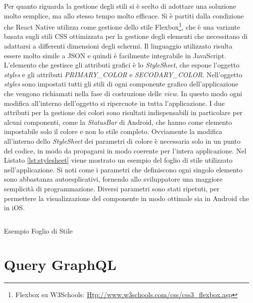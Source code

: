 Per quanto riguarda la gestione degli stili si è scelto di adottare una soluzione molto semplice, ma allo stesso tempo molto efficace. Si è partiti dalla condizione che React Native utilizza come gestione dello stile Flexbox\footnote{Flexbox su W3Schools: \url{Htp://www.w3schools.com/css/css3_flexbox.asp}}, che è una variante basata sugli stili CSS ottimizzata per la gestione degli elementi che necessitano di adattarsi a differenti dimensioni degli schermi. Il linguaggio utilizzato risulta essere molto simile a JSON e quindi è facilmente integrabile in JavaScript. L'elemento che gestisce gli attributi grafici è lo \emph{StyleSheet}, che espone l'oggetto \emph{styles} e gli attributi \emph{PRIMARY\_COLOR} e \emph{SECODARY\_COLOR}.
Nell'oggetto \emph{styles} sono impostati tutti gli stili di ogni componente grafico dell'applicazione che vengono richiamati nella fase di costruzione delle \emph{view}. In questo modo ogni modifica all'interno dell'oggetto si ripercuote in tutta l'applicazione.
I due attributi per la gestione dei colori sono risultati indispensabili in particolare per alcuni componenti, come la \emph{StatusBar} di Android, che hanno come elemento impostabile solo il colore e non lo stile completo. Ovviamente la modifica all'interno dello \emph{StyleSheet} dei parametri di colore è necessaria solo in un punto del codice, in modo da propagarsi in modo coerente per l'intera applicazione.
Nel Listato \ref{lst:stylesheet} viene mostrato un esempio del foglio di stile utilizzato nell'applicazione. Si noti come i parametri che definiscono ogni singolo elemento sono abbastanza autoesplicativi, fornendo allo sviluppatore una maggiore semplicità di programmazione. Diversi parametri sono stati ripetuti, per permettere la visualizzazione del componente in modo ottimale sia in Android che in iOS.

\begin{listing}[H]
	\inputminted{js}{6-implementazione-app/Codice/stylesheet.js}
	\caption{Esempio Foglio di Stile}
	\label{lst:stylesheet}
\end{listing}

\section{Query GraphQL}\label{sec:utilizzo-dati-app}

